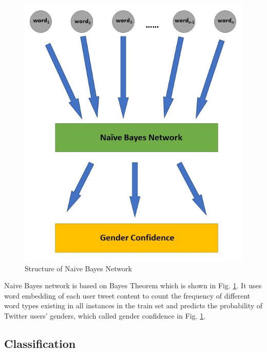 \documentclass{article}
\begin{document}
\begin{figure}[ht]
\vskip 0.2in
\begin{center}
\centerline{\includegraphics[width=\columnwidth]{fig2.jpg}}
\caption{Structure of Naive Bayes Network}
\label{fig2}
\end{center}
\vskip -0.2in
\end{figure} 

Naive Bayes network is based on Bayes Theorem which is shown in Fig. \ref{fig2}. It uses word embedding of each user tweet content to count the frequency of different word types existing in all instances in the train set and predicts the probability of Twitter users' genders, which called gender confidence in Fig. \ref{fig2}.

\subsection{Classification}
\end{document}
